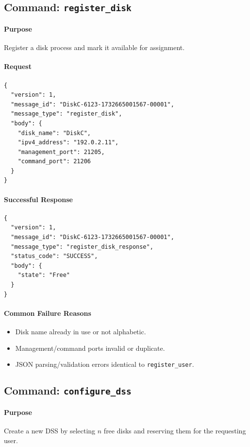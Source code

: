 \documentclass[11pt]{article}
\begin{document}
\subsection{Command: \texttt{register\_disk}}
\paragraph{Purpose} Register a disk process and mark it available for assignment.

\paragraph{Request}
\begin{verbatim}
{
  "version": 1,
  "message_id": "DiskC-6123-1732665001567-00001",
  "message_type": "register_disk",
  "body": {
    "disk_name": "DiskC",
    "ipv4_address": "192.0.2.11",
    "management_port": 21205,
    "command_port": 21206
  }
}
\end{verbatim}

\paragraph{Successful Response}
\begin{verbatim}
{
  "version": 1,
  "message_id": "DiskC-6123-1732665001567-00001",
  "message_type": "register_disk_response",
  "status_code": "SUCCESS",
  "body": {
    "state": "Free"
  }
}
\end{verbatim}

\paragraph{Common Failure Reasons}
\begin{itemize}
  \item Disk name already in use or not alphabetic.
  \item Management/command ports invalid or duplicate.
  \item JSON parsing/validation errors identical to \texttt{register\_user}.
\end{itemize}

\subsection{Command: \texttt{configure\_dss}}
\paragraph{Purpose} Create a new DSS by selecting $n$ free disks and reserving them for the requesting user.
\end{document}
